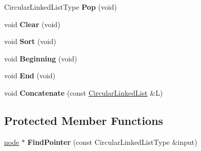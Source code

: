 \begin{DoxyCompactItemize}
\item 
\hypertarget{class_data_structures_1_1_circular_linked_list_a4ec7084b10a554f32021a8ea298838a3}{Circular\-Linked\-List\-Type {\bfseries Pop} (void)}\label{class_data_structures_1_1_circular_linked_list_a4ec7084b10a554f32021a8ea298838a3}

\item 
\hypertarget{class_data_structures_1_1_circular_linked_list_a81e1d0da5ab3c3de3cadc41191075891}{void {\bfseries Clear} (void)}\label{class_data_structures_1_1_circular_linked_list_a81e1d0da5ab3c3de3cadc41191075891}

\item 
\hypertarget{class_data_structures_1_1_circular_linked_list_afe72f0175ee659b26ad599693fc5b4ee}{void {\bfseries Sort} (void)}\label{class_data_structures_1_1_circular_linked_list_afe72f0175ee659b26ad599693fc5b4ee}

\item 
\hypertarget{class_data_structures_1_1_circular_linked_list_a453cf3bafc9ff7ae5ab13456a88f1a98}{void {\bfseries Beginning} (void)}\label{class_data_structures_1_1_circular_linked_list_a453cf3bafc9ff7ae5ab13456a88f1a98}

\item 
\hypertarget{class_data_structures_1_1_circular_linked_list_a9a4e832ea30d76d1dbe597c14e2d91d0}{void {\bfseries End} (void)}\label{class_data_structures_1_1_circular_linked_list_a9a4e832ea30d76d1dbe597c14e2d91d0}

\item 
\hypertarget{class_data_structures_1_1_circular_linked_list_a42010425d7c024def67b54b0c41fda23}{void {\bfseries Concatenate} (const \hyperlink{class_data_structures_1_1_circular_linked_list}{Circular\-Linked\-List} \&L)}\label{class_data_structures_1_1_circular_linked_list_a42010425d7c024def67b54b0c41fda23}

\end{DoxyCompactItemize}
\subsection*{Protected Member Functions}
\begin{DoxyCompactItemize}
\item 
\hypertarget{class_data_structures_1_1_circular_linked_list_ab94fe9fff660e829d5013231bf8cb10e}{\hyperlink{struct_data_structures_1_1_circular_linked_list_1_1node}{node} $\ast$ {\bfseries Find\-Pointer} (const Circular\-Linked\-List\-Type \&input)}\label{class_data_structures_1_1_circular_linked_list_ab94fe9fff660e829d5013231bf8cb10e}

\end{DoxyCompactItemize}
